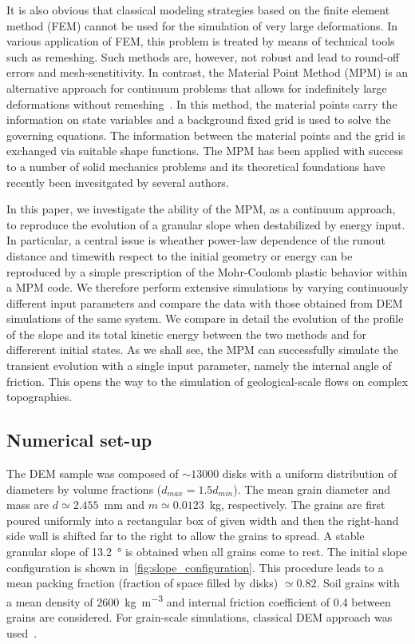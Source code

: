 \documentclass[3p,times,procedia,number]{elsarticle}
\begin{document}
It is also obvious that classical modeling strategies based on the finite
element method (FEM) cannot be used for the simulation of very large
deformations. In various application of FEM, this problem is treated by means
of technical tools such as remeshing. Such methods are, however, not robust and
lead to round-off errors and mesh-senstitivity. In contrast, the 
Material Point Method (MPM) is an alternative approach for continuum problems
that allows for indefinitely large deformations without 
remeshing~\citep{Soga2016, Bandara2014, Bardenhagen2000, Sulsky1995}. In this
method, the material points carry the information on state variables and a
background fixed grid is used to solve the governing equations. The information 
between the material points and the grid is exchanged via suitable shape
functions. The MPM has been applied with success to a number of solid mechanics
problems and its theoretical foundations have recently been invesitgated by
several authors. 

In this paper, we investigate the ability of the MPM, as a continuum
approach, to reproduce the evolution of a granular slope
when destabilized by energy input. In particular, a central issue is wheather
power-law dependence of the runout distance and timewith respect to the initial
geometry or energy can be reproduced by a simple prescription of the
Mohr-Coulomb plastic behavior within a  MPM code. We therefore perform
extensive simulations by varying continuously different input parameters and
compare the data with those obtained from DEM simulations of the same system.
We compare in detail the evolution of the profile of the slope and its total
kinetic energy between the two methods and for differerent initial states. As
we shall see, the MPM can successfully simulate  the transient evolution with a
single input parameter, namely the internal angle of friction. This opens the
way to the simulation of geological-scale flows on complex topographies. 

\subsection{Numerical set-up}
\label{sec:num}

The DEM sample was composed of $\sim13000$ disks with a uniform distribution of 
diameters by volume fractions ($d_{max} = 1.5 d_{min}$). The mean grain 
diameter and mass are $d\simeq 2.455 $~\si{\mm} and $m\simeq 0.0123$~\si{\kg}, 
respectively. The grains are first poured uniformly into a rectangular box of 
given width and then the right-hand side wall is shifted far to the right 
to allow the grains to spread. A stable granular slope of 13.2~\si{\degree} is 
obtained when all grains come to rest. The initial slope configuration is shown
in~\cref{fig:slope_configuration}. This 
procedure leads to a mean packing fraction (fraction of space filled by disks)
$\simeq 0.82$. Soil grains with a mean density of 2600~\si{\kg\per\m\cubed} and
internal friction coefficient of 0.4 between grains are considered. For 
grain-scale simulations, classical DEM approach was used~\citep{Cundall1979a}. 
\end{document}
